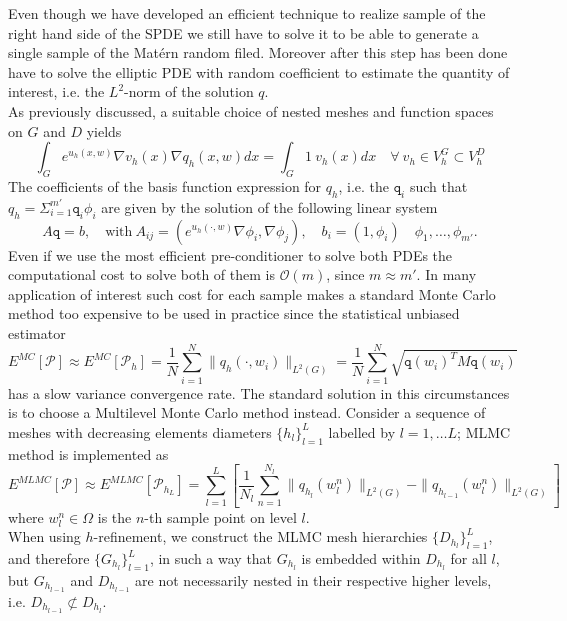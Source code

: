 \documentclass[a4paper, 11pt, oneside]{scrartcl}
\begin{document}
Even though we have developed an efficient technique to realize sample of the right hand side of the SPDE we still have to solve it to be able to generate a single sample of the Matérn random filed. Moreover after this step has been done have to solve the elliptic PDE with random coefficient to estimate the quantity of interest, i.e. the \(L^2\)-norm of the solution \(q\).\\
As previously discussed, a suitable choice of nested meshes and function spaces on \(G\) and \(D\) yields
\begin{equation}
\int_G e^{u_h(x,w)} \nabla v_h(x) \nabla q_h(x,w) dx = \int_G 1 \ v_h(x) dx \quad \forall \ v_h \in V_h^G \subset V_h^D
\end{equation}
The coefficients of the basis function expression for \(q_h\), i.e. the \(\texttt{q}_i\) such that \(q_h = \Sigma_{i=1}^{m'} \texttt{q}_i\phi_i \) are given by the solution of the following linear system
\begin{equation}
A \texttt{q} = b, \quad \text{with} \ A_{ij} = (e^{u_h(\cdot,w)} \nabla \phi_i,\nabla \phi_j), \quad b_i = (1,\phi_i) \quad \phi_1, \dots, \phi_{m'}.
\end{equation}
Even if we use the most efficient pre-conditioner to solve both PDEs the computational cost to solve both of them is \( \mathcal{O}(m)\), since \( m \approx m'\).
In many application of interest such cost for each sample makes a standard Monte Carlo method too expensive to be used in practice since the statistical unbiased estimator
\begin{equation}
E^{MC}[\mathcal{P}] \approx E^{MC}[\mathcal{P}_h] = \frac1N \sum_{i=1}^N \|q_h(\cdot,w_i) \|_{L^2(G)} = \frac1N \sum_{i=1}^N \sqrt{\texttt{q}(w_i)^T M \texttt{q}(w_i)}
\end{equation}
has a slow variance convergence rate.
The standard solution in this circumstances is to choose a Multilevel Monte Carlo method instead. 
Consider a sequence of meshes with decreasing elements diameters \( \{h_l\}_{l=1}^L\) labelled by \( l = 1, \dots L\); MLMC method is implemented as
\begin{equation}
E^{MLMC}[\mathcal{P}] \approx  E^{MLMC}[\mathcal{P}_{h_L}] = \sum_{l=1}^L \left[ \frac{1}{N_l}  \sum_{n=1}^{N_l}  \| q_{h_l}(w_l^n) \|_{L^2(G)}-\|q_{h_{l-1}}(w_l^n) \|_{L^2(G)} \right]
\end{equation}
where \( w_l^n \in \Omega\) is the \(n\)-th sample point on level \(l\). \\
When using \(h\)-refinement, we construct the MLMC mesh hierarchies \( \{ D_{h_l}\}_{l=1}^L\), and therefore \( \{ G_{h_l}\}_{l=1}^L\), in such a way that \(  G_{h_l} \) is embedded within \( D_{h_l}\) for all \(l\), but \(  G_{h_{l-1}} \) and \(  D_{h_{l-1}} \) are not necessarily nested in their respective higher levels, i.e. \( D_{h_{l-1}} \not\subset D_{h_l} \).
\end{document}
